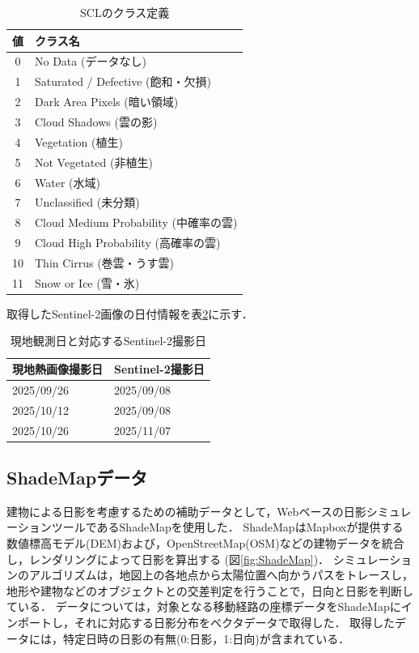 \documentclass[12pt,epsf]{jreport}
\begin{document}
\begin{table}[H]
    \centering
    \caption{SCLのクラス定義}
    \label{tab:scl_classes}
    \begin{tabular}{cl}
        \toprule
        \textbf{値} & \textbf{クラス名} \\
        \midrule
        0 & No Data (データなし) \\
        1 & Saturated / Defective (飽和・欠損) \\
        2 & Dark Area Pixels (暗い領域) \\
        3 & Cloud Shadows (雲の影) \\
        4 & Vegetation (植生) \\
        5 & Not Vegetated (非植生) \\
        6 & Water (水域) \\
        7 & Unclassified (未分類) \\
        8 & Cloud Medium Probability (中確率の雲) \\
        9 & Cloud High Probability (高確率の雲) \\
        10 & Thin Cirrus (巻雲・うす雲) \\
        11 & Snow or Ice (雪・氷) \\
        \bottomrule
    \end{tabular}
\end{table}


取得したSentinel-2画像の日付情報を表\ref{tab:Sentinel-2_list}に示す．

\begin{table}[H]
  \centering
  \caption{現地観測日と対応するSentinel-2撮影日}
  \label{tab:Sentinel-2_list}
  \begin{tabular}{|l|l|}  
    \hline
    \textbf{現地熱画像撮影日} & \textbf{Sentinel-2撮影日}  \\
    \hline
    2025/09/26&2025/09/08 \\
    \hline
    2025/10/12&2025/09/08 \\
    \hline
    2025/10/26&2025/11/07 \\
    \hline
  \end{tabular}
\end{table}



\subsection{ShadeMapデータ}
\label{subsec:Shade}
建物による日影を考慮するための補助データとして，Webベースの日影シミュレーションツールであるShadeMapを使用した\cite{ShadeMap_Help}．
ShadeMapはMapboxが提供する数値標高モデル(DEM)および，OpenStreetMap(OSM)などの建物データを統合し，レンダリングによって日影を算出する (図\ref{fig:ShadeMap})．
シミュレーションのアルゴリズムは，地図上の各地点から太陽位置へ向かうパスをトレースし，地形や建物などのオブジェクトとの交差判定を行うことで，日向と日影を判断している．
データについては，対象となる移動経路の座標データをShadeMapにインポートし，それに対応する日影分布をベクタデータで取得した．
取得したデータには，特定日時の日影の有無(0:日影，1:日向)が含まれている．
\end{document}
